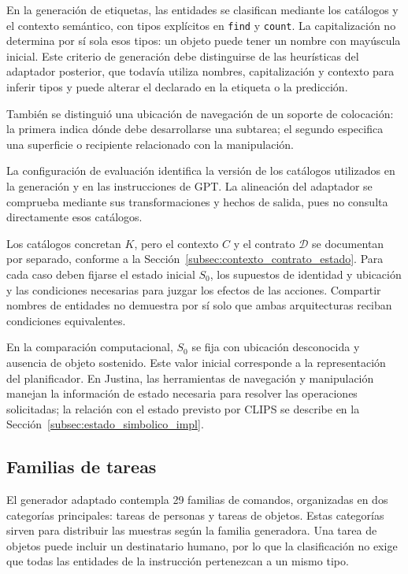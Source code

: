 En la generación de etiquetas, las entidades se clasifican mediante los catálogos y el contexto semántico, con tipos explícitos en \texttt{find} y \texttt{count}. La capitalización no determina por sí sola esos tipos: un objeto puede tener un nombre con mayúscula inicial. Este criterio de generación debe distinguirse de las heurísticas del adaptador posterior, que todavía utiliza nombres, capitalización y contexto para inferir tipos y puede alterar el declarado en la etiqueta o la predicción.

También se distinguió una ubicación de navegación de un soporte de colocación: la primera indica dónde debe desarrollarse una subtarea; el segundo especifica una superficie o recipiente relacionado con la manipulación.

La configuración de evaluación identifica la versión de los catálogos utilizados en la generación y en las instrucciones de GPT. La alineación del adaptador se comprueba mediante sus transformaciones y hechos de salida, pues no consulta directamente esos catálogos.

Los catálogos concretan $K$, pero el contexto $C$ y el contrato $\mathcal{D}$ se documentan por separado, conforme a la Sección~\ref{subsec:contexto_contrato_estado}. Para cada caso deben fijarse el estado inicial $S_0$, los supuestos de identidad y ubicación y las condiciones necesarias para juzgar los efectos de las acciones. Compartir nombres de entidades no demuestra por sí solo que ambas arquitecturas reciban condiciones equivalentes.

En la comparación computacional, $S_0$ se fija con ubicación desconocida
y ausencia de objeto sostenido. Este valor inicial corresponde a la
representación del planificador. En Justina, las herramientas de navegación
y manipulación manejan la información de estado necesaria para resolver
las operaciones solicitadas; la relación con el estado previsto por CLIPS
se describe en la Sección~\ref{subsec:estado_simbolico_impl}.


\subsection{Familias de tareas}

El generador adaptado contempla 29 familias de comandos, organizadas en
dos categorías principales: tareas de personas y tareas de objetos.
Estas categorías sirven para distribuir las muestras según la familia
generadora. Una tarea de objetos puede incluir un destinatario humano,
por lo que la clasificación no exige que todas las entidades de la
instrucción pertenezcan a un mismo tipo.

